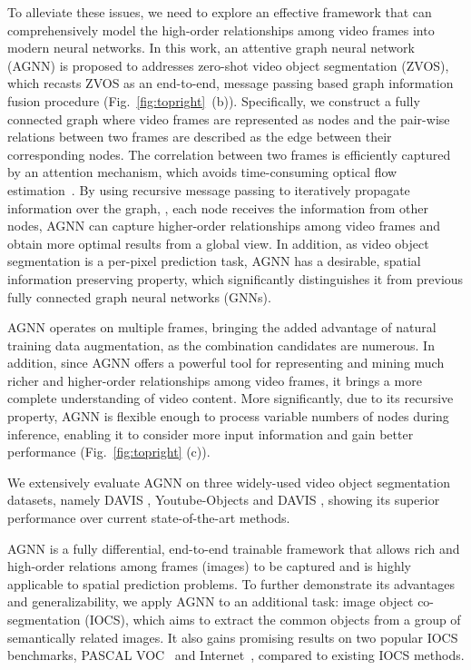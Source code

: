 \documentclass[10pt,twocolumn,letterpaper]{article}
\begin{document}
To alleviate these issues, we need to explore an effective framework that can comprehensively model the high-order relationships among video frames into modern neural networks. In this work, an attentive graph neural network (AGNN) is proposed to addresses zero-shot video object segmentation (ZVOS), which recasts ZVOS as an end-to-end, message passing based graph information fusion procedure (Fig.~\ref{fig:topright}~(b)). Specifically, we construct a fully connected graph where video frames are represented as nodes and the pair-wise relations between two frames are described as the edge between their corresponding nodes. The correlation between two frames is efficiently captured by an attention mechanism, which avoids time-consuming optical flow estimation~\cite{cheng2017segflow,DBLP:conf/cvpr/TokmakovAS17,jain2017fusionseg,DBLP:conf/iccv/TokmakovAS17,Li_2018_ECCV1}.
By using recursive message passing to iteratively propagate information over the graph, \ie, each node receives the information from other nodes, AGNN can capture higher-order relationships among video frames and obtain more optimal results from a global view. In addition, as video object segmentation is a per-pixel prediction task, AGNN has a desirable, spatial information preserving property, which significantly distinguishes it from previous fully connected graph neural networks (GNNs).

AGNN operates on multiple frames, bringing the added advantage of natural training data augmentation,  as the combination candidates are numerous. In addition, since AGNN offers a powerful tool for representing
and mining much richer and higher-order relationships among video frames, it brings a more complete understanding of video content.
More significantly, due to its recursive property, AGNN is flexible enough to process variable numbers of nodes during inference, enabling it  to consider more input information and gain better performance (Fig.~\ref{fig:topright} (c)).

We extensively evaluate AGNN on three widely-used video object segmentation datasets, namely DAVIS \cite{perazzi2016benchmark}, Youtube-Objects \cite{DBLP:conf/cvpr/PrestLCSF12} and DAVIS \cite{pont20172017}, showing its superior performance over current state-of-the-art methods.

AGNN is a fully differential, end-to-end trainable framework that allows rich and high-order relations among frames (images) to be captured  and is highly applicable to spatial prediction problems. To further demonstrate its advantages and generalizability, we apply AGNN to an additional task:
image object co-segmentation (IOCS), which aims to extract the common objects from a group of semantically related images. It also gains promising results on two popular IOCS benchmarks, PASCAL VOC~\cite{pascal-voc-2012} and Internet~\cite{Rubinstein_2013_CVPR}, compared to existing IOCS methods.
\end{document}
